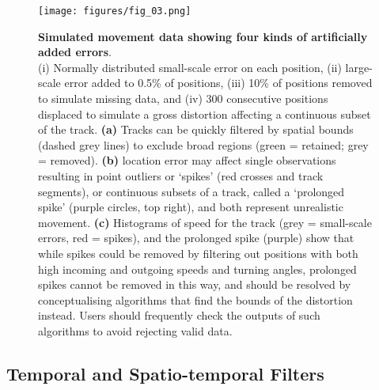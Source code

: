 \begin{refsection}[sorting=nyt]
    \begin{figure}[h!]
        \centering
        \texttt{[image: figures/fig\_03.png]}
        \caption{
            \textbf{Simulated movement data showing four kinds of artificially added errors}.\\
            (i) Normally distributed small-scale error on each position, (ii) large-scale error added to 0.5\% of positions, (iii) 10\% of positions removed to simulate missing data, and (iv) 300 consecutive positions displaced to simulate a gross distortion affecting a continuous subset of the track.
            \textbf{(a)} Tracks can be quickly filtered by spatial bounds (dashed grey lines) to exclude broad regions (green = retained; grey = removed).
            \textbf{(b)} location error may affect single observations resulting in point outliers or `spikes' (red crosses and track segments), or continuous subsets of a track, called a `prolonged spike' (purple circles, top right), and both represent unrealistic movement.
            \textbf{(c)} Histograms of speed for the track (grey = small-scale errors, red = spikes), and the prolonged spike (purple) show that while spikes could be removed by filtering out positions with both high incoming and outgoing speeds and turning angles, prolonged spikes cannot be removed in this way, and should be resolved by conceptualising algorithms that find the bounds of the distortion instead.
            Users should frequently check the outputs of such algorithms to avoid rejecting valid data.
        }
        \label{fig:figure_filtering_data}
    \end{figure}

    \subsection*{Temporal and Spatio-temporal Filters}


\end{refsection}
